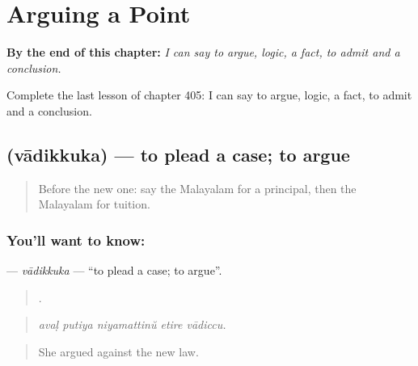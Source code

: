
\chapter{Arguing a Point}
\label{ch:ml-arguing-a-point}

\begin{chapteropening}
\textbf{By the end of this chapter:} \emph{I can say to argue, logic, a fact, to admit and a conclusion.}

Complete the last lesson of chapter 405: I can say to argue, logic, a fact, to admit and a conclusion.
\end{chapteropening}

\section[\texorpdfstring{\ml{വാദിക്കുക} (vādikkuka)}{വാദിക്കുക (vādikkuka)}]{ (vādikkuka) — to plead a case; to argue}

\label{lesson:ML-C405-vadikkuka}



\begin{quote}
Before the new one: say the Malayalam for a principal, then the Malayalam for tuition.
\end{quote}

\subsection*{You'll want to know: }
\textbf{} — \emph{vādikkuka} — \textquotedblleft{}to plead a case; to argue\textquotedblright{}.

\begin{quote}
    .
\end{quote}

\begin{quote}
\emph{avaḷ putiya niyamattinŭ etire vādiccu.}
\end{quote}

\begin{quote}
She argued against the new law.
\end{quote}

